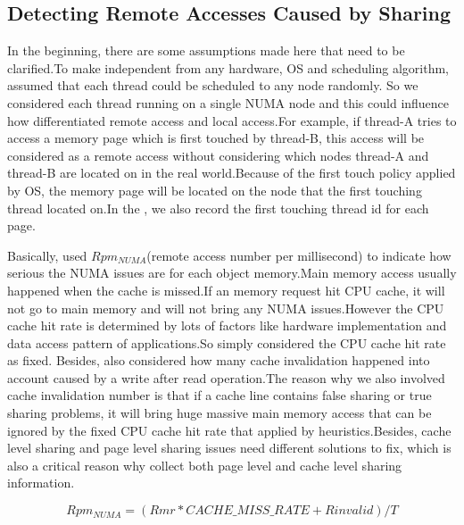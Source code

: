 

\subsection{Detecting Remote Accesses Caused by Sharing}
In the beginning, there are some assumptions \NP{} made here that need to be clarified.To make \NP{} independent from any hardware, OS and scheduling algorithm, \NP{} assumed that each thread could be scheduled to any node randomly. So we considered each thread running on a single NUMA node and this could influence how \NP{} differentiated remote access and local access.For example, if thread-A tries to access a memory page which is first touched by thread-B, this access will be considered as a remote access without considering which nodes thread-A and thread-B are located on in the real world.Because of the first touch policy applied by OS, the memory page will be located on the node that the first touching thread located on.In the \NP{}, we also record the first touching thread id for each page.

Basically, \NP{} used $Rpm_{NUMA}$(remote access number per millisecond) to indicate how serious the NUMA issues are for each object memory.Main memory access usually happened when the cache is missed.If an memory request hit CPU cache, it will not go to main memory and will not bring any NUMA issues.However the CPU cache hit rate is determined by lots of factors like hardware implementation and data access pattern of applications.So \NP{} simply considered the CPU cache hit rate as fixed. Besides, \NP{} also considered how many cache invalidation happened into account caused by a write after read operation.The reason why we also involved cache invalidation number is that if a cache line contains false sharing or true sharing problems, it will bring huge massive main memory access that can be ignored by the fixed CPU cache hit rate that \NP{} applied by heuristics.Besides, cache level sharing and page level sharing issues need different solutions to fix, which is also a critical reason why \NP{} collect both page level and cache level sharing information.

\begin{equation}
Rpm_{NUMA} = (Rmr * CACHE\_MISS\_RATE + Rinvalid)/T \label{Rpm_NUMA}
\end{equation}

